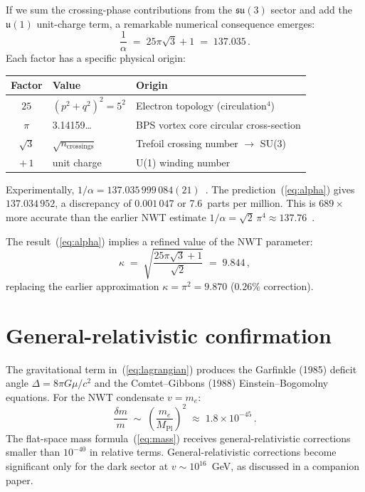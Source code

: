 \documentclass[11pt]{article}
\begin{document}
If we sum the crossing-phase contributions from the
$\mathfrak{su}(3)$ sector and add the $\mathfrak{u}(1)$ unit-charge
term, a remarkable numerical consequence emerges:
\begin{equation}
\boxed{\;
\frac{1}{\alpha} \;=\; 25\pi\sqrt{3} + 1
    \;=\; 137.035\,.
\;}
\label{eq:alpha}
\end{equation}
Each factor has a specific physical origin:
\begin{center}
\begin{tabular}{cll}
\toprule
\textbf{Factor} & \textbf{Value} & \textbf{Origin} \\
\midrule
$25$ & $(p^2+q^2)^2 = 5^2$ &
    Electron topology (circulation$^4$) \\
$\pi$ & 3.14159\ldots &
    BPS vortex core circular cross-section \\
$\sqrt{3}$ & $\sqrt{n_\text{crossings}}$ &
    Trefoil crossing number $\to$ SU(3) \\
$+\,1$ & unit charge &
    U(1) winding number \\
\bottomrule
\end{tabular}
\end{center}

\noindent
Experimentally, $1/\alpha = 137.035\,999\,084(21)$~\cite{CODATA2018}.
The prediction~(\ref{eq:alpha}) gives $137.034\,952$, a discrepancy
of $0.001\,047$ or 7.6~parts per million.  This is $689\times$ more
accurate than the earlier NWT estimate $1/\alpha = \sqrt{2}\,\pi^4
\approx 137.76$~\cite{NWT1}.

The result~(\ref{eq:alpha}) implies a refined value of the NWT
parameter:
\begin{equation}
\kappa \;=\; \sqrt{\frac{25\pi\sqrt{3}+1}{\sqrt{2}}}
    \;=\; 9.844\,,
\end{equation}
replacing the earlier approximation $\kappa = \pi^2 = 9.870$
($0.26\%$ correction).


\section{General-relativistic confirmation}
\label{sec:gr}

The gravitational term in~(\ref{eq:lagrangian}) produces the
Garfinkle (1985) deficit angle $\Delta = 8\pi G\mu/c^2$ and the
Comtet--Gibbons (1988) Einstein--Bogomolny equations.  For the NWT
condensate $v = m_e$:
\begin{equation}
\frac{\delta m}{m} \;\sim\;
    \left(\frac{m_e}{M_\text{Pl}}\right)^{\!2}
    \;\approx\; 1.8 \times 10^{-45}\,.
\end{equation}
The flat-space mass formula~(\ref{eq:mass}) receives general-relativistic
corrections smaller than $10^{-40}$ in relative terms.  General-relativistic
corrections become significant only for the dark sector at $v \sim
10^{16}$~GeV, as discussed in a companion paper.
\end{document}
